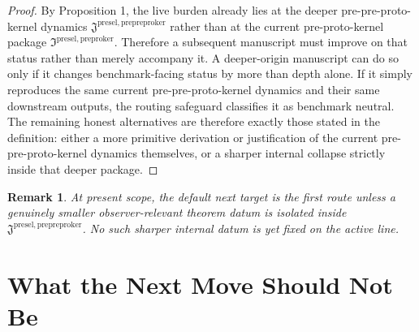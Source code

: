 \documentclass[11pt]{article}
\newcommand{\PrePreProtoKernelPackage}{\mathfrak J^{\mathrm{presel,prepreproker}}}
\newcommand{\PreProtoKernelPackage}{\mathfrak I^{\mathrm{presel,preproker}}}
\newtheorem{remark}{Remark}
\begin{document}
\begin{proof}
By Proposition 1, the live burden already lies at the deeper pre-pre-proto-kernel dynamics \(\PrePreProtoKernelPackage\) rather than at the current pre-proto-kernel package \(\PreProtoKernelPackage\). Therefore a subsequent manuscript must improve on that status rather than merely accompany it. A deeper-origin manuscript can do so only if it changes benchmark-facing status by more than depth alone. If it simply reproduces the same current pre-pre-proto-kernel dynamics and their same downstream outputs, the routing safeguard classifies it as benchmark neutral. The remaining honest alternatives are therefore exactly those stated in the definition: either a more primitive derivation or justification of the current pre-pre-proto-kernel dynamics themselves, or a sharper internal collapse strictly inside that deeper package.
\end{proof}

\begin{remark}
At present scope, the default next target is the first route unless a genuinely smaller observer-relevant theorem datum is isolated inside \(\PrePreProtoKernelPackage\). No such sharper internal datum is yet fixed on the active line.
\end{remark}

\section{What the Next Move Should Not Be}
\end{document}
